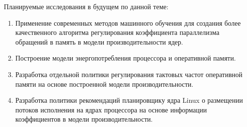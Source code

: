     Планируемые исследования в будущем по данной теме:
    \begin{enumerate}
        \item Применение современных методов машинного обучения для создания более качественного
        алгоритма регулирования коэффициента параллелизма обращений в память в модели производительности ядер.
        \item Построение модели энергопотребления процессора и оперативной памяти.
        \item Разработка отдельной политики регулирования тактовых частот оперативной памяти на основе
        построенной модели производительности.
        \item Разработка политики рекомендаций планировщику ядра Linux о размещении потоков исполнения на ядрах
        процессора на основе информации коэффициентов в модели производительности.
    \end{enumerate}

\newpage
